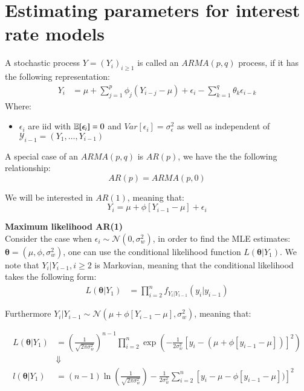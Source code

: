 \chapter{Estimating parameters for interest rate models} 
\label{chp_AppendixA}

\begin{definition}
A stochastic process $Y = (Y_{i})_{i\geq 1}$ is called an $ARMA(p,q)$ process, if it has the following representation: 
\begin{align*}
Y_{i} &= \mu + \sum_{j=1}^{p}\phi_{j}(Y_{i-j}-\mu) + \epsilon_{i} - \sum_{k=1}^{q}\theta_{k}\epsilon_{i-k} \end{align*}
Where: 
\begin{itemize}[leftmargin =*]
    \item $\epsilon_{i}$ are iid with $\mathbb{E}[\epsilon_{i}] = 0$ and $Var[\epsilon_{i}] = \sigma_{\epsilon}^{2}$ as well as independent of \\ 
    $\mathcal{Y}_{i-1} = (Y_{1}, \dots, Y_{i-1})$
\end{itemize}
\end{definition}


A special case of an $ARMA(p,q)$ is $AR(p)$, we have the the following relationship: 
\[
AR(p) = ARMA(p,0)
\]

We will be interested in $AR(1)$, meaning that: 
\[
Y_{i} = \mu + \phi[Y_{i-1}-\mu] + \epsilon_{i}
\]

\textbf{Maximum likelihood AR(1)}
\\
Consider the case when $\epsilon_{i} \sim \mathcal{N}(0, \sigma_{w}^{2})$, in order to find the MLE estimates: $\bm{\theta} = (\mu, \phi, \sigma_{w}^{2})$, one can use the conditional likelihood function $L(\bm{\theta}|Y_{1})$. We note that $Y_{i}|Y_{i-1}, i \geq 2$ is Markovian, meaning that the conditional likelihood takes the following form: 
\begin{align*}
L(\bm{\theta}|Y_{1}) &= \prod_{i=2}^{n}f_{Y_{i}|Y_{i-1}}(y_{i}|y_{i-1})  
\end{align*}

Furthermore $Y_{i}|Y_{i-1} \sim \mathcal{N}(\mu + \phi[Y_{i-1}-\mu], \sigma_{w}^{2})$, meaning that: 

\begin{align*}
L(\bm{\theta}|Y_{1}) &= \left(
\frac{1}{
\sqrt{
2\pi\sigma_{w}^{2}
}
}
\right)^{n-1}\prod_{i=2}^{n}\exp\left(
-\frac{1}{2\sigma_{w}^{2}}\left[
y_{i}-(\mu + \phi[y_{i-1}-\mu])
\right]^{2}
\right) \\ 
&\Downarrow \\ 
l(\bm{\theta}|Y_{1}) &= 
(n-1)\ln\left(
\frac{1}{
\sqrt{
2\pi\sigma_{w}^{2}
}
}
\right)
-\frac{1}{2\sigma_{w}^{2}}
\sum_{i=2}^{n}
\left[
y_{i}-\mu - \phi[y_{i-1}-\mu])
\right]^{2}
\end{align*}

